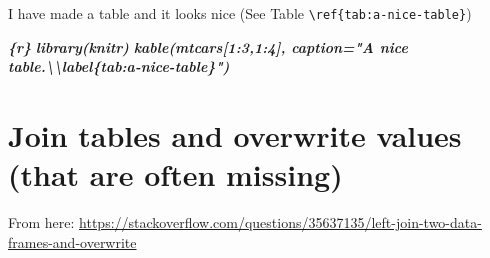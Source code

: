 \documentclass[
]{book}
\newenvironment{Shaded}{\begin{snugshade}}{\end{snugshade}}
\newcommand{\InformationTok}[1]{\textcolor[rgb]{0.56,0.35,0.01}{\textbf{\textit{#1}}}}
\begin{document}
I have made a table and it looks nice (See Table \texttt{\textbackslash{}ref\{tab:a-nice-table\}})

\begin{Shaded}
\begin{Highlighting}[]
\InformationTok{\textasciigrave{}\textasciigrave{}\textasciigrave{}\{r\}}
\InformationTok{library(knitr)}
\InformationTok{kable(mtcars[1:3,1:4], caption="A nice table.\textbackslash{}\textbackslash{}label\{tab:a{-}nice{-}table\}")}
\InformationTok{\textasciigrave{}\textasciigrave{}\textasciigrave{}}
\end{Highlighting}
\end{Shaded}

\hypertarget{join-tables-and-overwrite-values-that-are-often-missing}{%
\section{Join tables and overwrite values (that are often missing)}\label{join-tables-and-overwrite-values-that-are-often-missing}}

From here: \url{https://stackoverflow.com/questions/35637135/left-join-two-data-frames-and-overwrite}
\end{document}
